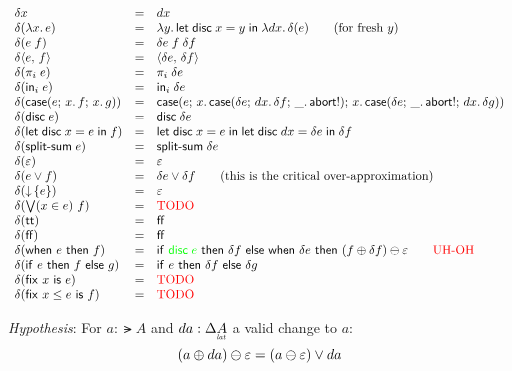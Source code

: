 \documentclass{article}
\begin{document}
\[
\begin{array}{lcll}
  \delta x &=& dx\\
  \delta(\fn\bind{x} e) &=& \fn\bind{y} \letdisc{x}{y} {\fn\bind{dx} \delta(e)}
  \qquad\text{(for fresh $y$)}\\
  \delta(e\;f) &=& \delta e \; f \; \delta f\\
  \delta \pair{e}{f} &=& \pair{\delta{e}}{\delta{f}}\\
  \delta(\pi_i\; e) &=& \pi_i\; \delta{e}\\
  \delta(\inj{i}{e}) &=& \inj{i}{\delta{e}}\\
  \delta(\case{e}{x}{f}{x}{g})
  &=& \case{e}
        {x}{\case{\delta e}{dx}{\delta f}{\_}{\ms{abort!}}}
        {x}{\case{\delta e}{\_}{\ms{abort!}}{dx}{\delta g}}\\
  \delta(\disc e) &=& \disc{\delta e}\\
  \delta(\letdisc{x}{e}{f}) &=&
  \letdisc{x}{e}{
    \letdisc{dx}{\delta e}{\delta f}}\\
  \delta(\splitsum{e}) &=&
  \splitsum{\delta e}\\
  \delta(\unit) &=& \unit\\
  \delta(e \vee f) &=& \delta e \vee \delta f
  \qquad \text{(this is the critical over-approximation)}\\
  \delta(\downintro{e}) &=& \unit\\
  \delta(\downelim{x}{e}{f}) &=& \text{\TODO}\\
  \delta(\ett) &=& \eff\\
  \delta(\eff) &=& \eff\\
  \delta(\when{e}{f})
  &=& \ifthen{\color{green} \disc{e}}{\delta f}{
    \when{\delta e}{(f \oplus \delta f) \ominus \unit}}
  \qquad \text{\color{red} UH-OH}\\
  \delta(\ifthen{e}{f}{g}) &=& \ifthen{e}{\delta f}{\delta g}\\
  \delta(\fix{x}{e}) &=& \text{\TODO}\\
  \delta(\fixle{x}{e}{f}) &=& \text{\TODO}
\end{array}
\]

\emph{Hypothesis}: For $a : \lat{A}$ and $da : \GD\lat{A}$ a valid change to
$a$:
\begin{equation*}
  (a \oplus da) \ominus \varepsilon = (a \ominus \varepsilon)
  \vee da
\end{equation*}
\end{document}
